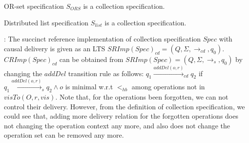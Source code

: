 
{\color {red}
\begin{lemma}
\label{lemma:OR-set is collection specification}
OR-set specification $S_{\mathit{ORS}}$ is a collection specification.
\end{lemma}
}


{\color {red}
\begin{lemma}
\label{lemma:list is collection specification}
Distributed list specification $S_{\mathit{list}}$ is a collection specification.
\end{lemma}
}


: The succinct reference implementation of collection specification $\mathit{Spec}$ with causal delivery is given as an LTS $\mathit{SRImp}(\mathit{Spec})_{\mathit{cd}} = (Q,\Sigma,\rightarrow_{\mathit{cd}},q_0)$. $\mathit{CRImp}(\mathit{Spec})_{\mathit{cd}}$ can be obtained from $\mathit{SRImp}(\mathit{Spec}) = (Q,\Sigma,\rightarrow_s,q_0)$ by changing the $\mathit{addDel}$ transition rule as follows: $q_1 {\xrightarrow{\mathit{addDel}(o,r)}}_{cd} q_2$ if $q_1 {\xrightarrow{\mathit{addDel}(o,r)}}_s q_2 \wedge o$ is minimal w.r.t $<_{hb}$ among operations not in $\mathit{visTo}(O,r,\mathit{vis})$. %
{\color {red}Note that, for the operations been forgotten, we can not control their delivery. However, from the definition of collection specification, we could see that, adding more delivery relation for the forgotten operations does not changing the operation context any more, and also does not change the operation set can be removed any more.} 
























